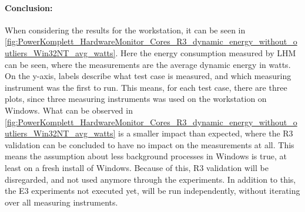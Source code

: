\paragraph{Conclusion:} When considering the results for the workstation, it can be seen in \cref{fig:PowerKomplett_HardwareMonitor_Cores_R3_dynamic_energy_without_outliers_Win32NT_avg_watts}. Here the energy consumption measured by LHM can be seen, where the measurements are the average dynamic energy in watts. On the y-axis, labels describe what test case is measured, and which measuring instrument was the first to run. This means, for each test case, there are three plots, since three measuring instruments was used on the workstation on Windows. What can be observed in \cref{fig:PowerKomplett_HardwareMonitor_Cores_R3_dynamic_energy_without_outliers_Win32NT_avg_watts} is a smaller impact than expected, where the R3 validation can be concluded to have no impact on the measurements at all. This means the assumption about less background processes in Windows is true, at least on a fresh install of Windows. Because of this, R3 validation will be disregarded, and not used anymore through the experiments. In addition to this, the E3 experiments not executed yet, will be run independently, without iterating over all measuring instruments.
